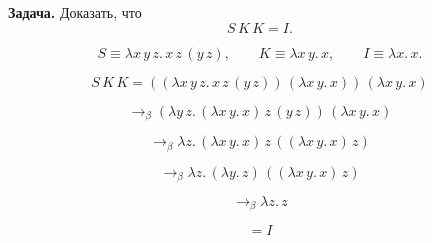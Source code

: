 \documentclass[12pt,a4paper]{article}
\begin{document}
\textbf{Задача.} Доказать, что
\[
S\,K\,K = I.
\]

\[
S \equiv \lambda x\,y\,z.\, x\,z\,(y\,z),
\qquad
K \equiv \lambda x\,y.\,x,
\qquad
I \equiv \lambda x.\,x.
\]

\[
S\,K\,K
=
((\lambda x\,y\,z.\, x\,z\,(y\,z))\,(\lambda x\,y.\,x))\,(\lambda x\,y.\,x)
\]

\[
\to_\beta
(\lambda y\,z.\, (\lambda x\,y.\,x)\,z\,(y\,z))\,(\lambda x\,y.\,x)
\]

\[
\to_\beta
\lambda z.\, (\lambda x\,y.\,x)\,z\,((\lambda x\,y.\,x)\,z)
\]

\[
\to_\beta
\lambda z.\, (\lambda y.\,z)\,((\lambda x\,y.\,x)\,z)
\]

\[
\to_\beta
\lambda z.\, z
\]

\[
= I
\]
\end{document}
